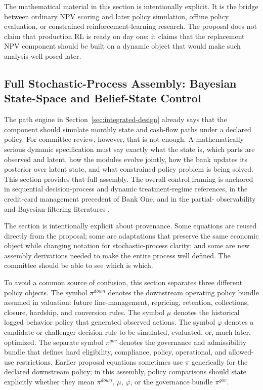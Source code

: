 \documentclass[11pt]{article}
\newcommand{\1}{\mathbf{1}}
\begin{document}
The mathematical material in this section is intentionally explicit.  It is the
bridge between ordinary NPV scoring and later policy simulation, offline policy
evaluation, or constrained reinforcement-learning research.  The proposal does
not claim that production RL is ready on day one; it claims that the replacement
NPV component should be built on a dynamic object that would make such analysis
well posed later.

\subsection{Full Stochastic-Process Assembly: Bayesian State-Space and Belief-State Control}
\label{sec:state-space-assembly}

The path engine in Section~\ref{sec:integrated-design} already says that the
component should simulate monthly state and cash-flow paths under a declared
policy. For committee review, however, that is not enough. A mathematically
serious dynamic specification must say exactly what the state is, which parts are
observed and latent, how the modules evolve jointly, how the bank updates its
posterior over latent state, and what constrained policy problem is being
solved. This section provides that full assembly. The overall control framing is
anchored in sequential decision-process and dynamic treatment-regime references,
in the credit-card management precedent of Bank One, and in the partial-
observability and Bayesian-filtering literatures
\citep{puterman1994mdp,murphy2003dynamic,trench2003bankone,
smallwood1973pomdp,kaelbling1998pomdp,durbinkoopman2012ssm,
westharrison1997bfdm,doucet2001smc}.

The section is intentionally explicit about provenance. Some equations are
reused directly from the proposal; some are adaptations that preserve the same
economic object while changing notation for stochastic-process clarity; and some
are new assembly derivations needed to make the entire process well defined. The
committee should be able to see which is which.

To avoid a common source of confusion, this section separates three different
policy objects. The symbol $\pi^{down}$ denotes the downstream operating policy
bundle assumed in valuation: future line-management, repricing, retention,
collections, closure, hardship, and conversion rules. The symbol $\mu$ denotes
the historical logged behavior policy that generated observed actions. The
symbol $\varphi$ denotes a candidate or challenger decision rule to be simulated,
evaluated, or, much later, optimized. The separate symbol $\pi^{gov}$ denotes
the governance and admissibility bundle that defines hard eligibility,
compliance, policy, operational, and allowed-use restrictions. Earlier proposal
equations sometimes use $\pi$ generically for the declared downstream policy; in
this assembly, policy comparisons should state explicitly whether they mean
$\pi^{down}$, $\mu$, $\varphi$, or the governance bundle $\pi^{gov}$.
\end{document}
